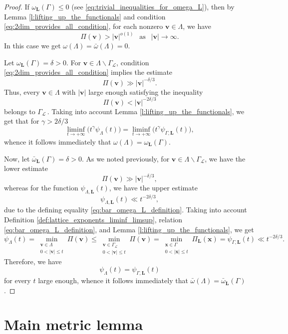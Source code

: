 \documentclass[a4paper,12pt]{article}
\theoremstyle{definition}
\theoremstyle{remark}
\theoremstyle{plain}
\renewcommand{\vec}[1]{\mathbf{#1}}
\renewcommand{\leq}{\leqslant}
\newcommand{\La}{\Lambda}
\newcommand{\Ga}{\Gamma}
\newcommand{\cL}{\mathcal{L}}
\newcommand{\bL}{\mathbf{L}}
\begin{document}
\begin{proof}
  If $\omega_\bL(\Ga)\leq0$ (see \eqref{eq:trivial_inequalities_for_omega_L}), then by Lemma \ref{l:lifting_up_the_functionals} and condition \eqref{eq:2dim_provides_all_condition}, for each nonzero $\vec v\in\La$, we have
  \[
    \Pi(\vec v)>|\vec v|^{o(1)}
    \ \ \text{ as }\ \ |\vec v|\to\infty.
  \]
  In this case we get $\omega(\La)=\bar\omega(\La)=0$.
  
  Let $\omega_\bL(\Ga)=\delta>0$. For $\vec v\in\La\backslash\Ga_\cL$, condition \eqref{eq:2dim_provides_all_condition} implies the estimate
  \[
    \Pi(\vec v)\gg|\vec v|^{-\delta/3}.
  \]
  Thus, every $\vec v\in\La$ with $|\vec v|$ large enough satisfying the inequality
  \[
    \Pi(\vec v)<|\vec v|^{-2\delta/3}
  \]
  belongs to $\Ga_\cL$\,. Taking into account Lemma \ref{l:lifting_up_the_functionals}, we get that for $\gamma>2\delta/3$
  \[
    \liminf_{t\to+\infty}\big(t^\gamma\psi_{\La}(t)\big)=
    \liminf_{t\to+\infty}\big(t^\gamma\psi_{\Ga,\bL}(t)\big),
  \]
  whence it follows immediately that $\omega(\La)=\omega_\bL(\Ga)$.
  
  Now, let $\bar\omega_\bL(\Ga)=\delta>0$. As we noted previously, for $\vec v\in\La\backslash\Ga_\cL$, we have the lower estimate
  \[
    \Pi(\vec v)\gg|\vec v|^{-\delta/3},
  \]
  whereas for the function $\psi_{\La,\bL}(t)$, we have the upper estimate
  \[
    \psi_{\La,\bL}(t)\ll t^{-2\delta/3},
  \]
  due to the defining equality \eqref{eq:bar_omega_L_definition}. Taking into account Definition \ref{def:lattice_exponents_liminf_limsup}, relation \eqref{eq:bar_omega_L_definition}, and Lemma \ref{l:lifting_up_the_functionals}, we get
  \[
    \psi_{\La}(t)=
    \min_{\substack{ \vec v\in\La \\ 0<|\vec v|\leq t}}\Pi(\vec v)\leq
    \min_{\substack{ \vec v\in\Ga_\cL \\ 0<|\vec v|\leq t}}\Pi(\vec v)=
    \min_{\substack{ \vec x\in\Ga \\ 0<|\vec x|\leq t}}\Pi_\bL(\vec x)=
    \psi_{\Ga,\bL}(t)\ll t^{-2\delta/3}.
  \]
  Therefore, we have
  \[
    \psi_{\La}(t)=\psi_{\Ga,\bL}(t)
  \]
  for every $t$ large enough, whence it follows immediately that $\bar\omega(\La)=\bar\omega_\bL(\Ga)$.
\end{proof}


\section{Main metric lemma}\label{sec:metric_lemma}
\end{document}
